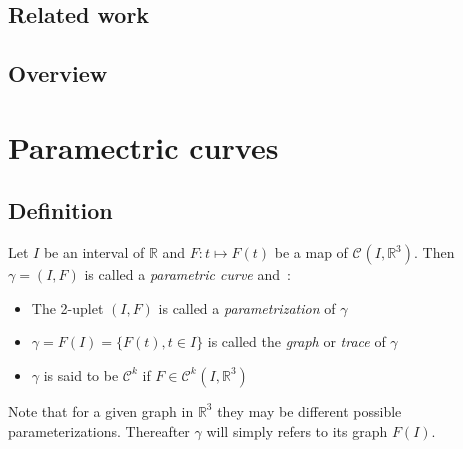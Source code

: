 \subsection{Related work}

\citet{Bishop1975}
\citep{Bishop1975}
\citeauthor{Bishop1975}
\citeyear{Bishop1975}

\cite{Bishop1975}
\cite{Bergou2008}
\cite{Hoffmann2008}
\cite{Bluth2014}
\cite{Frenet1852}
\cite{Delcourt2007}
\cite{Farouki2014}
\cite{Guggenheimer1989}
\cite{Klok1986}

\subsection{Overview}



\section{Paramectric curves}

\subsection{Definition}
Let $I$ be an interval of $\mathbb{R}$ and $F\colon t \mapsto F(t)$ be a map of ${\mathcal{C}}^{}(I,{\mathbb{R}}^3)$. Then $\gamma=(I,F)$ is called a \emph{parametric curve} and~:
\begin{itemize}
	\item The 2-uplet $(I,F)$ is called a \emph{parametrization} of $\gamma$
	\item $\gamma = F(I) = \{F(t), t \in I\}$ is called the \emph{graph} or \emph{trace} of $\gamma$
	\item $\gamma$ is said to be ${\mathcal{C}}^{k}$ if $F \in {\mathcal{C}^{k}}^{}(I,{\mathbb{R}}^3)$
\end{itemize}
Note that for a given graph in ${\mathbb{R}}^3$ they may be different possible parameterizations. Thereafter $\gamma$ will simply refers to its graph $F(I)$. 

